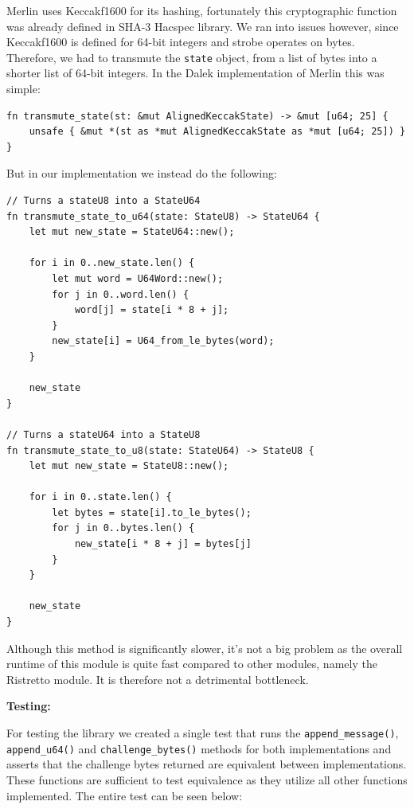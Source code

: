 \documentclass{article}
\begin{document}
Merlin uses Keccakf1600 for its hashing, fortunately this cryptographic
function was already defined in SHA-3 Hacspec library. We ran into
issues however, since Keccakf1600 is defined for 64-bit integers
and strobe operates on bytes. Therefore, we had to transmute the
\texttt{state} object, from a list of bytes into a shorter list of
64-bit integers. In the Dalek implementation of Merlin this was simple:

\begin{lstlisting}
fn transmute_state(st: &mut AlignedKeccakState) -> &mut [u64; 25] {
	unsafe { &mut *(st as *mut AlignedKeccakState as *mut [u64; 25]) }
}
\end{lstlisting}

But in our implementation we instead do the following: 

\begin{lstlisting}
// Turns a stateU8 into a StateU64
fn transmute_state_to_u64(state: StateU8) -> StateU64 {
	let mut new_state = StateU64::new();

	for i in 0..new_state.len() {
		let mut word = U64Word::new();
		for j in 0..word.len() {
			word[j] = state[i * 8 + j];
		}
		new_state[i] = U64_from_le_bytes(word);
	}

	new_state
}

// Turns a stateU64 into a StateU8
fn transmute_state_to_u8(state: StateU64) -> StateU8 {
	let mut new_state = StateU8::new();

	for i in 0..state.len() {
		let bytes = state[i].to_le_bytes();
		for j in 0..bytes.len() {
			new_state[i * 8 + j] = bytes[j]
		}
	}

	new_state
}
\end{lstlisting}

Although this method is significantly slower, it's not a big problem
as the overall runtime of this module is quite fast compared to other
modules, namely the Ristretto module. It is therefore not a detrimental
bottleneck.

\textbf{Testing:}

For testing the library we created a single test that runs
the \texttt{append\_message()}, \texttt{append\_u64()} and
\texttt{challenge\_bytes()} methods for both implementations and asserts
that the challenge bytes returned are equivalent between implementations. 
These functions are sufficient to test equivalence as they utilize all
other functions implemented. The entire test can be seen below:
\end{document}
